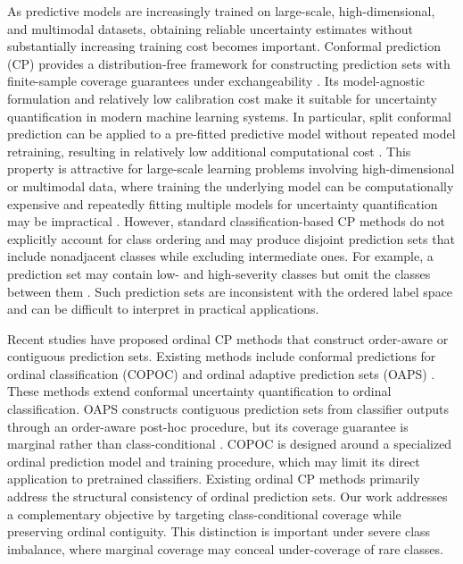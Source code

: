 \documentclass[conference]{IEEEtran}
\begin{document}
As predictive models are increasingly trained on large-scale, high-dimensional, and multimodal datasets, obtaining reliable uncertainty estimates without substantially increasing training cost becomes important. Conformal prediction (CP) provides a distribution-free framework for constructing prediction sets with finite-sample coverage guarantees under exchangeability \cite{vovk1999cp}. Its model-agnostic formulation and relatively low calibration cost make it suitable for uncertainty quantification in modern machine learning systems. In particular, split conformal prediction can be applied to a pre-fitted predictive model without repeated model retraining, resulting in relatively low additional computational cost \cite{zhou2025conformal}. This property is attractive for large-scale learning problems involving high-dimensional or multimodal data, where training the underlying model can be computationally expensive and repeatedly fitting multiple models for uncertainty quantification may be impractical \cite{grasselli2025uncertainty}. However, standard classification-based CP methods do not explicitly account for class ordering and may produce disjoint prediction sets that include nonadjacent classes while excluding intermediate ones. For example, a prediction set may contain low- and high-severity classes but omit the classes between them \cite{lu2022oaps,zhang2026cps}. Such prediction sets are inconsistent with the ordered label space and can be difficult to interpret in practical applications. 

Recent studies have proposed ordinal CP methods that construct order-aware or contiguous prediction sets. Existing methods include conformal predictions for ordinal classification (COPOC) \cite{dey2023copoc} and ordinal adaptive prediction sets (OAPS) \cite{lu2022oaps}. These methods extend conformal uncertainty quantification to ordinal classification. OAPS constructs contiguous prediction sets from classifier outputs through an order-aware post-hoc procedure, but its coverage guarantee is marginal rather than class-conditional \cite{lu2022oaps}. COPOC is designed around a specialized ordinal prediction model and training procedure, which may limit its direct application to pretrained classifiers. Existing ordinal CP methods primarily address the structural consistency of ordinal prediction sets. Our work addresses a complementary objective by targeting class-conditional coverage while preserving ordinal contiguity. This distinction is important under severe class imbalance, where marginal coverage may conceal under-coverage of rare classes.
\end{document}
